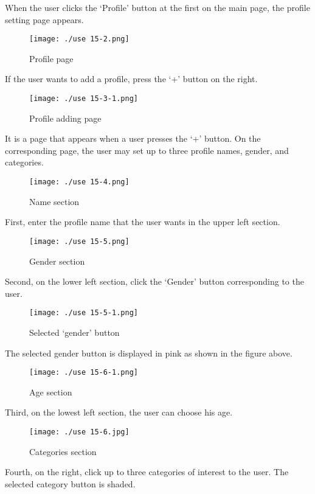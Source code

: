 \documentclass[conference]{IEEEtran}
\begin{document}
When the user clicks the ‘Profile' button at the first on the main page, the profile setting page appears.

\begin{figure}[H]
\texttt{[image: ./use 15-2.png]}
\centering
\caption{Profile page}
\end{figure}

If the user wants to add a profile, press the ‘+' button on the right.

\begin{figure}[H]
\texttt{[image: ./use 15-3-1.png]}
\centering
\caption{Profile adding page}
\end{figure}

It is a page that appears when a user presses the ‘+' button. On the corresponding page, the user may set up to three profile names, gender, and categories.

\begin{figure}[H]
\texttt{[image: ./use 15-4.png]}
\centering
\caption{Name section}
\end{figure}

First, enter the profile name that the user wants in the upper left section.

\begin{figure}[H]
\texttt{[image: ./use 15-5.png]}
\centering
\caption{Gender section}
\end{figure}

Second, on the lower left section, click the ‘Gender' button corresponding to the user.

\begin{figure}[H]
\texttt{[image: ./use 15-5-1.png]}
\centering
\caption{Selected ‘gender' button}
\end{figure}

The selected gender button is displayed in pink as shown in the figure above.

\begin{figure}[H]
\texttt{[image: ./use 15-6-1.png]}
\centering
\caption{Age section}
\end{figure}

Third, on the lowest left section, the user can choose his age.

\begin{figure}[H]
\texttt{[image: ./use 15-6.jpg]}
\centering
\caption{Categories section}
\end{figure}

Fourth, on the right, click up to three categories of interest to the user. The selected category button is shaded.
\end{document}
